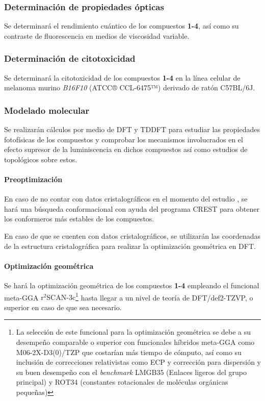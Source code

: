 \documentclass[spanish,mexico,12pt]{scrartcl}
\newcommand\scan{\(\text{r}^{2}\text{SCAN-3c}\)}
\begin{document}
\subsubsection{Determinación de propiedades ópticas}
Se determinará el rendimiento cuántico de los compuestos \textbf{1-4}, así como su contraste de fluorescencia en medios de viscosidad variable.

\subsubsection{Determinación de citotoxicidad}
Se determinará la citotoxicidad de los compuestos \textbf{1-4} en la línea celular de melanoma murino \emph{B16F10} (ATCC® CCL-6475™) derivado de ratón C57BL/6J.

\subsubsection{Modelado molecular}
Se realizarán cálculos \insilico{} por medio de \gls{DFT} y \gls{TDDFT} para estudiar las propiedades fotofísicas de los compuestos y comprobar los mecanismos involucrados en el efecto supresor de la luminiscencia en dichos compuestos así como estudios de topológicos sobre estos.

\paragraph{Preoptimización}
En caso de no contar con datos cristalográficos en el momento del estudio \insilico{}, se hará una búsqueda conformacional con ayuda del programa \gls{CREST} \cite{prachtAutomatedExplorationLowenergy2020} para obtener los conformeros más estables de los compuestos.

En caso de que se cuenten con datos cristalográficos, se utilizarán las coordenadas de la estructura cristalográfica para realizar la optimización geométrica en DFT.

\paragraph{Optimización geométrica}
Se hará la optimización geométrica de los compuestos \textbf{1-4} empleando el funcional meta-GGA \scan{}\footnote{La selección de este funcional para la optimización geométrica se debe a su desempeño comparable o superior con funcionales híbridos meta-GGA como M06-2X-D3(0)/TZP que costarían más tiempo de cómputo, así como su inclusión de correcciones relativistas como ECP y corrección para dispersión y su buen desempeño con el \emph{benchmark} LMGB35 (Enlaces ligeros del grupo principal) y ROT34 (constantes rotacionales de moléculas orgánicas pequeñas)} \cite{gasevicOptimizationSCAN3cComposite2022} hasta llegar a un nivel de teoría de DFT/def2-TZVP, o superior en caso de que sea necesario.
\end{document}
